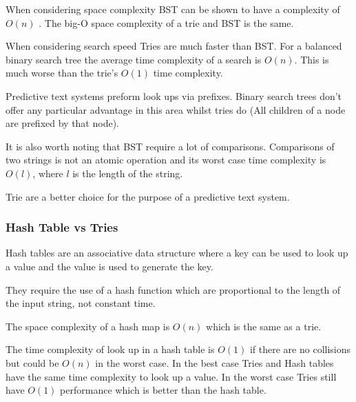 \documentclass[10pt]{article} %
\begin{document}
			    When considering space complexity BST can be shown to have a complexity of \begin{math}O(n)\end{math} \cite{book:BST:complexity}. 
			    The big-O space complexity of a trie and BST is the same.
			    
			    When considering search speed Tries are much faster than BST. For a balanced binary search tree the average time complexity of a search is \begin{math} O(n) \end{math}. This is much worse than the trie's \begin{math} O(1) \end{math} time complexity.
			    
			    Predictive text systems preform look ups via prefixes. Binary search trees don't offer any particular advantage in this area whilst tries do (All children of a node are prefixed by that node).
			    
			    It is also worth noting that BST require a lot of comparisons. Comparisons of two strings is not an atomic operation and its worst case time complexity is \begin{math}O(l)\end{math}, where \begin{math}l\end{math} is the length of the string.
			    
			    Trie are a better choice for the purpose of a predictive text system. 
			    
			\subsubsection{Hash Table vs Tries}
			    Hash tables are an associative data structure where a key can be used to look up a value and the value is used to generate the key.
			    
			    They require the use of a hash function which are proportional to the length of the input string, not constant time.
			    
			    The space complexity of a hash map is \begin{math} O(n) \end{math} which is the same as a trie.
			    
			    The time complexity of look up in a hash table is \begin{math} O(1) \end{math} if there are no collisions but could be \begin{math} O(n) \end{math} in the worst case. In the best case Tries and Hash tables have the same time complexity to look up a value. In the worst case Tries still have \begin{math} O(1) \end{math} performance which is better than the hash table.
			    
\end{document}
